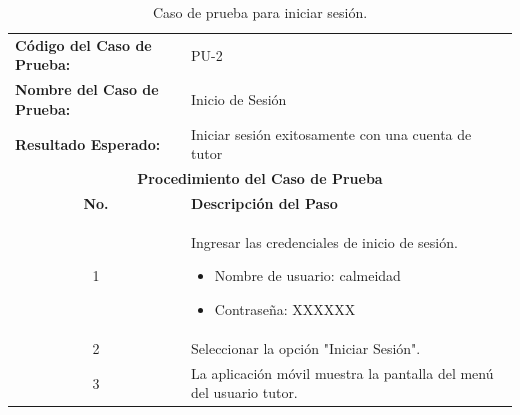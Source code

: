 \documentclass[a4paper,fleqn]{cas-sc}
\begin{document}
				\begin{table}[hbt!]
					\centering
					\caption{Caso de prueba para iniciar sesión.}
					\label{tab:login-test-case}
					\begin{tabularx}{\textwidth}{l X}
						\toprule
						\textbf{Código del Caso de Prueba:} & PU-2 \\
						\textbf{Nombre del Caso de Prueba:} & Inicio de Sesión \\
						\textbf{Resultado Esperado:} & Iniciar sesión exitosamente con una cuenta de tutor \\ \midrule
						\multicolumn{2}{c}{\textbf{Procedimiento del Caso de Prueba}} \\ \midrule
						\multicolumn{1}{c}{\textbf{No.}} & \textbf{Descripción del Paso} \\ \midrule
						\multicolumn{1}{c}{1} & Ingresar las credenciales de inicio de sesión.
						\begin{itemize}
							\item Nombre de usuario: calmeidad
							\item Contraseña: XXXXXX
						\end{itemize} \\
						\multicolumn{1}{c}{2} & Seleccionar la opción "Iniciar Sesión". \\
						\multicolumn{1}{c}{3} & La aplicación móvil muestra la pantalla del menú del usuario tutor. \\
						\bottomrule
					\end{tabularx}
				\end{table}
				
\end{document}
